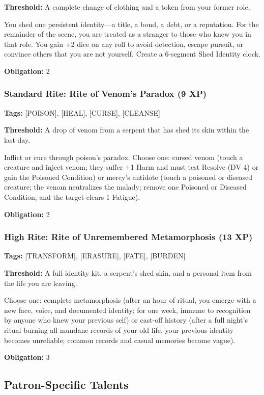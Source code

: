 \textbf{Threshold:} A complete change of clothing and a token from your former role.

You shed one persistent identity—a title, a bond, a debt, or a reputation. For the remainder of the scene, you are treated as a stranger to those who knew you in that role. You gain +2 dice on any roll to avoid detection, escape pursuit, or convince others that you are not yourself. Create a 6-segment Shed Identity clock.

\textbf{Obligation:} 2

\subsubsection{Standard Rite: Rite of Venom's Paradox (9 XP)}

\textbf{Tags:} [POISON], [HEAL], [CURSE], [CLEANSE]

\textbf{Threshold:} A drop of venom from a serpent that has shed its skin within the last day.

Inflict or cure through poison's paradox. Choose one: cursed venom (touch a creature and inject venom; they suffer +1 Harm and must test Resolve (DV 4) or gain the Poisoned Condition) or mercy's antidote (touch a poisoned or diseased creature; the venom neutralizes the malady; remove one Poisoned or Diseased Condition, and the target clears 1 Fatigue).

\textbf{Obligation:} 2

\subsubsection{High Rite: Rite of Unremembered Metamorphosis (13 XP)}

\textbf{Tags:} [TRANSFORM], [ERASURE], [FATE], [BURDEN]

\textbf{Threshold:} A full identity kit, a serpent's shed skin, and a personal item from the life you are leaving.

Choose one: complete metamorphosis (after an hour of ritual, you emerge with a new face, voice, and documented identity; for one week, immune to recognition by anyone who knew your previous self) or cast-off history (after a full night's ritual burning all mundane records of your old life, your previous identity becomes unreliable; common records and casual memories become vague).

\textbf{Obligation:} 3

\subsection{Patron-Specific Talents}

